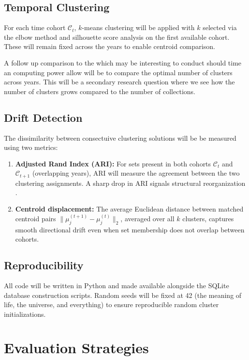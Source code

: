 \documentclass[11pt, letterpaper]{article}
\begin{document}
\subsection{Temporal Clustering}

For each time cohort $\mathcal{C}_t$, $k$-means clustering will be applied with $k$ selected via the elbow method and silhouette score analysis on the first available cohort. These will remain fixed across the years to enable centroid comparison. 

A follow up comparison to the which may be interesting to conduct should time an computing power allow will be to compare the optimal number of clusters across years. This will be a secondary research question where we see how the number of clusters grows compared to the number of collections. 

\subsection{Drift Detection}

The dissimilarity between consectuive clustering solutions will be be measured using two metrics:

\begin{enumerate}
    \item \textbf{Adjusted Rand Index (ARI):} For sets present in both cohorts $\mathcal{C}_t$ and $\mathcal{C}_{t+1}$ (overlapping years), ARI will measure the agreement between the two clustering assignments. A sharp drop in ARI signals structural reorganization \cite{mishra2025cluster}.
    \item \textbf{Centroid displacement:} The average Euclidean distance between matched centroid pairs $\|\mu_j^{(t+1)} - \mu_j^{(t)}\|_2$, averaged over all $k$ clusters, captures smooth directional drift even when set membership does not overlap between cohorts.
\end{enumerate}

\subsection{Reproducibility}

All code will be written in Python and made available alongside the SQLite database construction scripts. Random seeds will be fixed at 42 (the meaning of life, the universe, and everything) to ensure reproducible random cluster initializations. 

\section{Evaluation Strategies}
\end{document}
